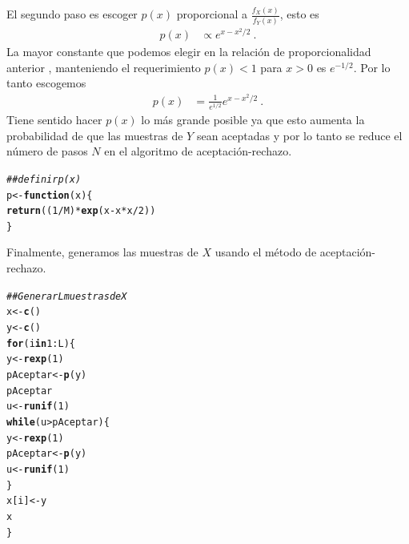 \documentclass[12pt,reqno]{amsart}\usepackage[]{graphicx}\usepackage[]{color}
\makeatletter
\newcommand{\hlnum}[1]{\textcolor[rgb]{0.686,0.059,0.569}{#1}}%
\newcommand{\hlcom}[1]{\textcolor[rgb]{0.678,0.584,0.686}{\textit{#1}}}%
\newcommand{\hlopt}[1]{\textcolor[rgb]{0,0,0}{#1}}%
\newcommand{\hlstd}[1]{\textcolor[rgb]{0.345,0.345,0.345}{#1}}%
\newcommand{\hlkwa}[1]{\textcolor[rgb]{0.161,0.373,0.58}{\textbf{#1}}}%
\newcommand{\hlkwb}[1]{\textcolor[rgb]{0.69,0.353,0.396}{#1}}%
\newcommand{\hlkwc}[1]{\textcolor[rgb]{0.333,0.667,0.333}{#1}}%
\newcommand{\hlkwd}[1]{\textcolor[rgb]{0.737,0.353,0.396}{\textbf{#1}}}%
\newenvironment{kframe}{%
 \def\at@end@of@kframe{}%
 \ifinner\ifhmode%
  \def\at@end@of@kframe{\end{minipage}}%
  \begin{minipage}{\columnwidth}%
 \fi\fi%
 \def\FrameCommand##1{\hskip\@totalleftmargin \hskip-\fboxsep
 \colorbox{shadecolor}{##1}\hskip-\fboxsep
     \hskip-\linewidth \hskip-\@totalleftmargin \hskip\columnwidth}%
 \MakeFramed {\advance\hsize-\width
   \@totalleftmargin\z@ \linewidth\hsize
   \@setminipage}}%
 {\par\unskip\endMakeFramed%
 \at@end@of@kframe}
\newenvironment{knitrout}{}{} %
\makeatother
\begin{document}
El segundo paso es escoger $p(x)$ proporcional a $\frac{f_{X}(x)}{f_{Y}(x)}$, esto es
\begin{equation*}
  \begin{split}
  p(x) &\propto e^{x-x^2/2}\:.
  \end{split}
\end{equation*}
La mayor constante que podemos elegir en la relación de proporcionalidad anterior , manteniendo el requerimiento $p(x) < 1$ para $x>0$ es $e^{-1/2}$. Por lo tanto escogemos
\begin{equation*}
  \begin{split}
   p(x) &=\frac{1}{e^{1/2}} e^{x-x^2/2}\:.
  \end{split}
\end{equation*}
Tiene sentido hacer $p(x)$ lo más grande posible ya que esto aumenta la probabilidad de que las muestras de $Y$ sean aceptadas y por lo tanto se reduce el número de pasos $N$ en el algoritmo de aceptación-rechazo.
\begin{knitrout}
\color{fgcolor}\begin{kframe}
\begin{alltt}
\hlcom{## definir p(x)}
\hlstd{p} \hlkwb{<-} \hlkwa{function}\hlstd{(}\hlkwc{x}\hlstd{) \{}
    \hlkwd{return}\hlstd{((}\hlnum{1}\hlopt{/}\hlstd{M)} \hlopt{*} \hlkwd{exp}\hlstd{(x} \hlopt{-} \hlstd{x} \hlopt{*} \hlstd{x}\hlopt{/}\hlnum{2}\hlstd{))}
\hlstd{\}}
\end{alltt}
\end{kframe}
\end{knitrout}

Finalmente, generamos las muestras de $X$ usando el método de aceptación-rechazo.
\begin{knitrout}
\color{fgcolor}\begin{kframe}
\begin{alltt}
\hlcom{## Generar L muestras de X}
\hlstd{x} \hlkwb{<-} \hlkwd{c}\hlstd{()}
\hlstd{y} \hlkwb{<-} \hlkwd{c}\hlstd{()}
\hlkwa{for} \hlstd{(i} \hlkwa{in} \hlnum{1}\hlopt{:}\hlstd{L) \{}
    \hlstd{y} \hlkwb{<-} \hlkwd{rexp}\hlstd{(}\hlnum{1}\hlstd{)}
    \hlstd{pAceptar} \hlkwb{<-} \hlkwd{p}\hlstd{(y)}
    \hlstd{pAceptar}
    \hlstd{u} \hlkwb{<-} \hlkwd{runif}\hlstd{(}\hlnum{1}\hlstd{)}
    \hlkwa{while} \hlstd{(u} \hlopt{>} \hlstd{pAceptar) \{}
        \hlstd{y} \hlkwb{<-} \hlkwd{rexp}\hlstd{(}\hlnum{1}\hlstd{)}
        \hlstd{pAceptar} \hlkwb{<-} \hlkwd{p}\hlstd{(y)}
        \hlstd{u} \hlkwb{<-} \hlkwd{runif}\hlstd{(}\hlnum{1}\hlstd{)}
    \hlstd{\}}
    \hlstd{x[i]} \hlkwb{<-} \hlstd{y}
    \hlstd{x}
\hlstd{\}}
\end{alltt}
\end{kframe}
\end{knitrout}
\end{document}
